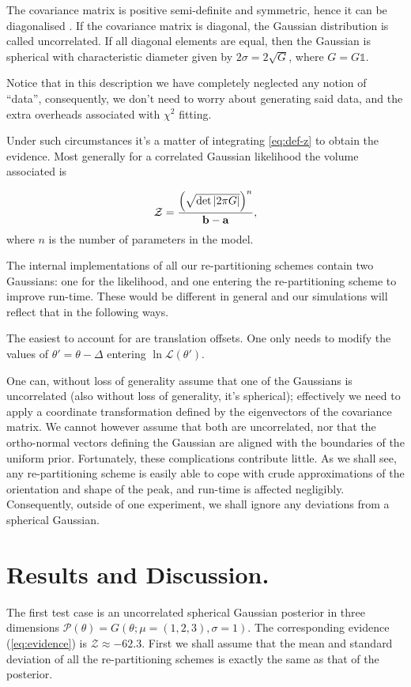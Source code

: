 \documentclass[usenatbib]{mnras}
\begin{document}
The covariance matrix is positive semi-definite and symmetric,
hence it can be diagonalised \citep{taboga2017lectures}. If the
covariance matrix is diagonal, the Gaussian distribution is called
uncorrelated. If all diagonal elements are equal, then the
Gaussian is spherical with characteristic diameter given by \(2
	\sigma = 2\sqrt{G}\), where \(G = G \mathds{1}\).

Notice that in this description we have completely neglected any
notion of ``data'', consequently, we don't need to worry about
generating said data, and the extra overheads associated with
\(\chi^2\) fitting.

Under such circumstances it's a matter of integrating \ref{eq:def-z}
to obtain the evidence. Most generally for a correlated Gaussian
likelihood the volume associated is 

\begin{equation}\label{eq:evidence}
   {\cal Z} = \frac{\left( \sqrt{ \det \left| 2\pi G \right|} \right)^{n}}{\mathbf{b}-\mathbf{a}}, 
\end{equation}
where \(n\) is the number of parameters in the model.

The internal implementations of all our re-partitioning schemes
contain two Gaussians: one for the likelihood, and one
entering the re-partitioning scheme to improve run-time. These
would be different in general and our simulations will reflect
that in the following ways.

The easiest to account for are translation offsets. One only needs to
modify the values of \(\theta' = \theta - \Delta\) entering \(\ln
	\mathcal{L}(\theta')\). 

One can, without loss of generality assume that one of the
Gaussians is uncorrelated (also without loss of generality, it's
spherical); effectively we need to apply a coordinate
transformation defined by the eigenvectors of the covariance
matrix. We cannot however assume that both are uncorrelated, nor
that the ortho-normal vectors defining the Gaussian are aligned
with the boundaries of the uniform prior. Fortunately, these
complications contribute little. As we shall see, any
re-partitioning scheme is easily able to cope with crude
approximations of the orientation and shape of the peak, and
run-time is affected negligibly. Consequently, outside of one
experiment, we shall ignore any deviations from a spherical
Gaussian.


\section{Results and Discussion.}
\label{sec:org430027a}
The first test case is an uncorrelated spherical Gaussian posterior
in three dimensions \(\mathcal{P}(\theta) = G(\theta; \mu = (1,2,3),
  \sigma = 1)\). The corresponding evidence (\autoref{eq:evidence}) is
\(\mathcal{Z}\approx-62.3\). First we shall assume that the mean and
standard deviation of all the re-partitioning schemes is exactly the
same as that of the posterior. 
\end{document}

